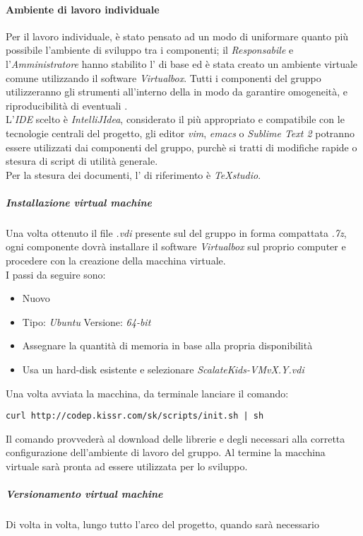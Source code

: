 \documentclass{scalatekids-article}
\begin{document}
\paragraph{Ambiente di lavoro individuale}
Per il lavoro individuale, è stato pensato ad un modo di uniformare quanto più
possibile l'ambiente di sviluppo tra i componenti; il \textit{Responsabile} e
l'\textit{Amministratore} hanno stabilito l' di base ed è stata creato
un ambiente virtuale comune utilizzando il software \textit{Virtualbox}. Tutti i
componenti del gruppo utilizzeranno gli strumenti all'interno della
 in modo da garantire omogeneità, e riproducibilità di
eventuali .\\ L'\textit{IDE} scelto è \textit{IntelliJIdea}, considerato il
più appropriato e compatibile con le tecnologie centrali del progetto, gli
editor \textit{vim}, \textit{emacs} o \textit{Sublime Text 2} potranno essere
utilizzati dai componenti del gruppo, purchè si tratti di modifiche rapide o
stesura di script di utilità generale.\\
Per la stesura dei documenti, l' di riferimento è \textit{TeXstudio}.
\subparagraph{Installazione virtual machine}
Una volta ottenuto il file \textit{.vdi} presente sul  del gruppo
in forma compattata \textit{.7z}, ogni componente dovrà installare il software
\textit{Virtualbox} sul proprio computer e procedere con la creazione della
macchina virtuale.\\
I passi da seguire sono:
\begin{itemize}
\item Nuovo
\item Tipo: \textit{Ubuntu} Versione: \textit{64-bit}
\item Assegnare la quantità di memoria in base alla propria disponibilità
\item Usa un hard-disk esistente e selezionare \textit{ScalateKids-VMvX.Y.vdi}
\end{itemize}
Una volta avviata la macchina, da terminale lanciare il comando:
\begin{center}
  \verb=curl http://codep.kissr.com/sk/scripts/init.sh | sh=
\end{center}
Il comando provvederà al download delle librerie e degli 
necessari alla corretta configurazione dell'ambiente di lavoro del gruppo.
Al termine la macchina virtuale sarà pronta ad essere utilizzata per lo sviluppo.
\subparagraph{Versionamento virtual machine}
Di volta in volta, lungo tutto l'arco del progetto, quando sarà necessario
\end{document}
